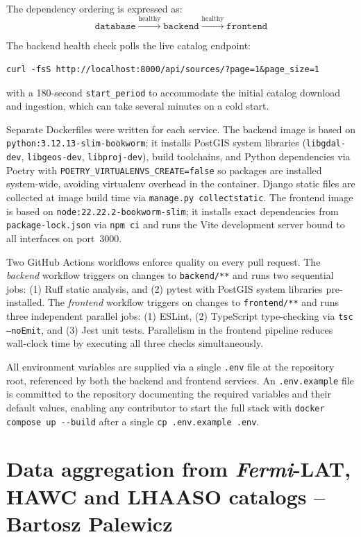 \documentclass[11pt, a4paper]{article}
\begin{document}
The dependency ordering is expressed as:
\begin{equation}
    \texttt{database} \xrightarrow{\text{healthy}} \texttt{backend} \xrightarrow{\text{healthy}} \texttt{frontend}
\end{equation}

The backend health check polls the live catalog endpoint:
\begin{verbatim}
curl -fsS http://localhost:8000/api/sources/?page=1&page_size=1
\end{verbatim}
with a 180-second \texttt{start\_period} to accommodate the initial catalog download and ingestion, which can take several minutes on a cold start.

Separate Dockerfiles were written for each service.
The backend image is based on \texttt{python:3.12.13-slim-bookworm}; it installs PostGIS system libraries (\texttt{libgdal-dev}, \texttt{libgeos-dev}, \texttt{libproj-dev}), build toolchains, and Python dependencies via Poetry with \texttt{POETRY\_VIRTUALENVS\_CREATE=false} so packages are installed system-wide, avoiding virtualenv overhead in the container.
Django static files are collected at image build time via \texttt{manage.py collectstatic}.
The frontend image is based on \texttt{node:22.22.2-bookworm-slim}; it installs exact dependencies from \texttt{package-lock.json} via \texttt{npm ci} and runs the Vite development server bound to all interfaces on port~3000.

Two GitHub Actions workflows enforce quality on every pull request.
The \emph{backend} workflow triggers on changes to \texttt{backend/**} and runs two sequential jobs: (1) Ruff static analysis, and (2) pytest with PostGIS system libraries pre-installed.
The \emph{frontend} workflow triggers on changes to \texttt{frontend/**} and runs three independent parallel jobs: (1) ESLint, (2) TypeScript type-checking via \texttt{tsc --noEmit}, and (3) Jest unit tests.
Parallelism in the frontend pipeline reduces wall-clock time by executing all three checks simultaneously.

All environment variables are supplied via a single \texttt{.env} file at the repository root, referenced by both the backend and frontend services.
An \texttt{.env.example} file is committed to the repository documenting the required variables and their default values, enabling any contributor to start the full stack with \texttt{docker compose up -{}-build} after a single \texttt{cp .env.example .env}.

\section{Data aggregation from \textit{Fermi}-LAT, HAWC and LHAASO catalogs -- Bartosz Palewicz}
\end{document}
